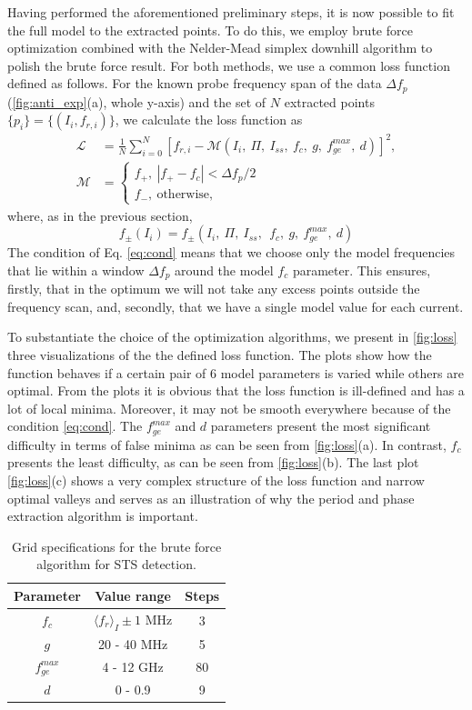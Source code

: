 \documentclass[%
 aip,
 draft,
 amsmath,amssymb,
 reprint,%
]{revtex4-1}
\begin{document}
 
Having performed the aforementioned preliminary steps, it is now possible to fit the full model to the extracted points. To do this, we employ brute force optimization combined with the Nelder-Mead simplex downhill algorithm\cite{nelder1965} to polish the brute force result. For both methods, we use a common loss function defined as follows. For the known probe frequency span of the data $\Delta f_p$ (\autoref{fig:anti_exp}(a), whole y-axis) and the set of $N$ extracted points $\{p_i\} = \{(I_i, f_{r,i})\}$, we calculate the loss function as
\begin{align}
\mathcal{L} &= \frac{1}{N}\sum_{i=0}^N [f_{r,i} - \mathcal{M}(I_i,\ \Pi, \ I_{ss},\ f_c,\ g,\ f_{ge}^{max},\ d)]^2,\label{eq:loss}\\
\mathcal{M} &= \begin{cases}
f_+,\  |f_+ - f_c|< \Delta f_p/2 \\
f_-,\ \text{otherwise}, \label{eq:cond}
\end{cases}
\end{align}
where, as in the previous section, $$f_{\pm}(I_i) = f_{\pm}(I_i,\ \Pi,\ I_{ss},\ \ f_c,\ g,\ f_{ge}^{max},\ d)$$
The condition of Eq. \eqref{eq:cond} means that we choose only the model frequencies that lie within a window $\Delta f_p$ around the model $f_c$ parameter. This ensures, firstly, that in the optimum we will not take any excess points outside the frequency scan, and, secondly, that we have a single model value for each current.

To substantiate the choice of the optimization algorithms, we present in \autoref{fig:loss} three visualizations of the the defined loss function. The plots show how the function behaves if a certain pair of 6 model parameters is varied while others are optimal. From the plots it is obvious that the loss function is ill-defined and has a lot of local minima. Moreover, it may not be smooth everywhere because of the condition \eqref{eq:cond}. The $f^{max}_{ge}$ and $d$ parameters present the most significant difficulty in terms of false minima as can be seen from \autoref{fig:loss}(a). In contrast, $f_c$ presents the least difficulty, as can be seen from \autoref{fig:loss}(b). The last plot \autoref{fig:loss}(c) shows a very complex structure of the loss function and narrow optimal valleys and serves as an illustration of why the period and phase extraction algorithm is important.

\begin{table}
	\centering
	\begin{ruledtabular}
		\begin{tabular}{ccc} 
			Parameter & Value range & Steps \\ 
			\hline
			$f_c$ & $\langle f_r \rangle_{I} \pm 1$ MHz & 3\\ 
			$g$ & 20 - 40 MHz & 5\\
			$f_{ge}^{max}$ &  4 - 12 GHz & 80 \\
			$d$& 0 - 0.9 & 9
		\end{tabular} 
	\end{ruledtabular}
	\caption{Grid specifications for the brute force algorithm for STS detection.}
	\label{tab:grid}
\end{table}
\end{document}
